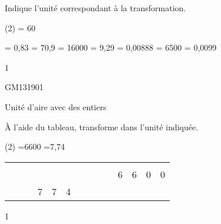 \documentclass[a4paper,11pt]{report}
\begin{document}
\begin{exop}
{Indique l'unité correspondant à la transformation. 
\begin{tasks}(2)
    \task {}= 60\dotfill \hspace{0.3cm}

    \task {} = 0,83 \dotfill \hspace{0.3cm}
  \task {}= 70,9\dotfill \hspace{0.3cm}
    \task {}= 16000\dotfill \hspace{0.3cm}
     \task {}= 9,29\dotfill \hspace{0.3cm}
     \task {}= 0,00888\dotfill \hspace{0.3cm}
     \task {}= 6500\dotfill \hspace{0.3cm}
     \task {}= 0,0099\dotfill \hspace{0.3cm}
\end{tasks}
}
{1}
\end{exop}

\begin{exof}{GM13}{190}{1}
\end{exof}


\begin{resolu}
{Unité d'aire avec des entiers}    
{À l'aide du tableau, transforme dans l'unité indiquée.

\begin{tasks}(2)
     \task {}=6600
     \hspace{0.3cm}
    \task {} =7,74
     \hspace{0.3cm}
\end{tasks}
\begin{center}


\begin{tabular}{*{14}{|x{0.7cm}}|}
 \hline
{} &  & &&&&\\
 &   & & & & &  &   & & & 6& 6& 0&0\\ 
 \hline

 &   & &7 & 7& 4&  &   & & & & & &\\

\hline

\end{tabular}
\end{center}
}
{1}
\end{resolu}
\end{document}
